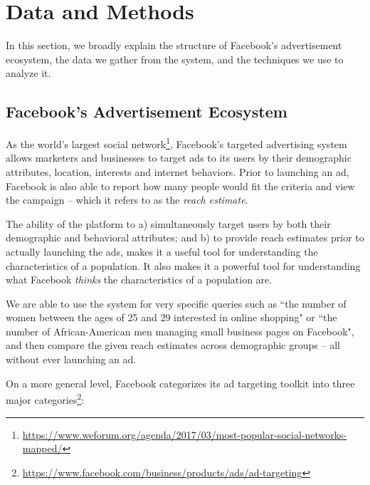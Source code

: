 \chapter{Data and Methods} \label{chap:data}

In this section, we broadly explain the structure of Facebook's advertisement ecosystem, the data we gather from the system, and the techniques we use to analyze it.

\section{Facebook's Advertisement Ecosystem} \label{sec:fb_ad_eco}


As the world's largest social network\footnote{\url{https://www.weforum.org/agenda/2017/03/most-popular-social-networks-mapped/}}, Facebook's targeted advertising system allows marketers and businesses to target ads to its users by their demographic attributes, location, interests and internet behaviors. Prior to launching an ad, Facebook is also able to report how many people would fit the criteria and view the campaign -- which it refers to as the \textit{reach estimate}.

The ability of the platform to a) simultaneously target users by both their demographic and behavioral attributes; and b) to provide reach estimates prior to actually launching the ads, makes it a useful tool for understanding the characteristics of a population. It also makes it a powerful tool for understanding what Facebook \textit{thinks} the characteristics of a population are.

We are able to use the system for very specific queries such as ``the number of women between the ages of 25 and 29 interested in online shopping" or ``the number of African-American men managing small business pages on Facebook", and then compare the given reach estimates across demographic groups -- all without ever launching an ad.

On a more general level, Facebook categorizes its ad targeting toolkit into three major categories\footnote{\url{https://www.facebook.com/business/products/ads/ad-targeting}}:

